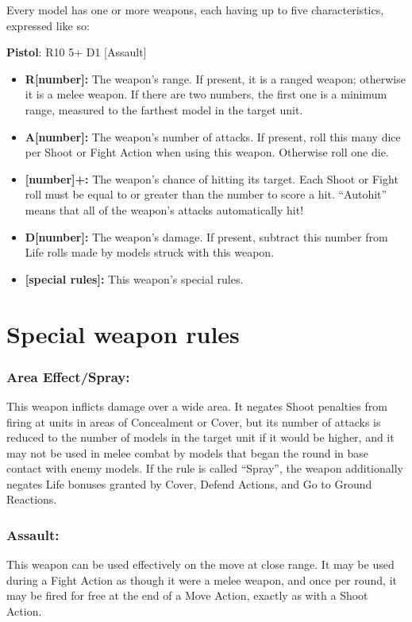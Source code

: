 \begin{multicols}{2}
Every model has one or more weapons, each having up to five characteristics, expressed like so:

\textbf{Pistol}: R10 5+ D1 [Assault]

\begin{itemize}
    \item \textbf{R[number]:} The weapon's range. If present, it is a ranged weapon; otherwise it is a melee weapon. If there are two numbers, the first one is a minimum range, measured to the farthest model in the target unit.
    \item \textbf{A[number]:} The weapon's number of attacks. If present, roll this many dice per Shoot or Fight Action when using this weapon. Otherwise roll one die.
    \item \textbf{[number]+:} The weapon's chance of hitting its target. Each Shoot or Fight roll must be equal to or greater than the number to score a hit. ``Autohit'' means that all of the weapon's attacks automatically hit!
    \item \textbf{D[number]:} The weapon's damage. If present, subtract this number from Life rolls made by models struck with this weapon.
    \item \textbf{[special rules]:} This weapon's special rules.
\end{itemize}




\section*{Special weapon rules}

\subsubsection*{Area Effect/Spray:} This weapon inflicts damage over a wide area. It negates Shoot penalties from firing at units in areas of Concealment or Cover, but its number of attacks is reduced to the number of models in the target unit if it would be higher, and it may not be used in melee combat by models that began the round in base contact with enemy models. If the rule is called ``Spray'', the weapon additionally negates Life bonuses granted by Cover, Defend Actions, and Go to Ground Reactions.

\subsubsection*{Assault:} This weapon can be used effectively on the move at close range. It may be used during a Fight Action as though it were a melee weapon, and once per round, it may be fired for free at the end of a Move Action, exactly as with a Shoot Action.


\end{multicols}
